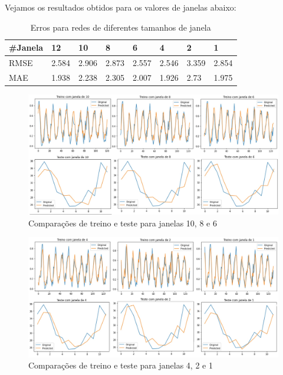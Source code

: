 \documentclass[12pt]{article}
\begin{document}
	Vejamos os resultados obtidos para os valores de janelas abaixo:
	
	\begin{table}[H]
		\centering
		\begin{tabular}{|l|l|l|l|l|l|l|l|}
			
			\hline
			\#Janela & 12    & 10    & 8     & 6     & 4     & 2     & 1     \\ \hline
			RMSE     & 2.584 & 2.906 & 2.873 & 2.557 & 2.546 & 3.359 & 2.854 \\ \hline
			MAE      & 1.938 & 2.238 & 2.305 & 2.007 & 1.926 & 2.73  & 1.975 \\ \hline
		\end{tabular}
		\caption{Erros para redes de diferentes tamanhos de janela}
	\end{table}

	\begin{figure}[H]
		\centering
		\includegraphics[width=0.9\linewidth]{Imagens/janelas/janelas6a10.jpg}
		\caption{Comparações de treino e teste para janelas 10, 8 e 6}
		\label{fig:janelas6a10}
	\end{figure}

	\begin{figure}[H]
		\centering
		\includegraphics[width=0.9\linewidth]{Imagens/janelas/janelas1a4.jpg}
		\caption{Comparações de treino e teste para janelas 4, 2 e 1}
		\label{fig:janelas1a4}
	\end{figure}
	
\end{document}
